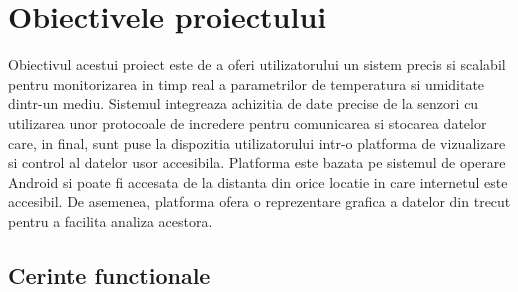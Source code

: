 \chapter{Obiectivele proiectului}\label{ch:obiective}
\pagestyle{fancy}
Obiectivul acestui proiect este de a oferi utilizatorului un sistem precis si scalabil pentru monitorizarea in timp real a parametrilor de temperatura si 
umiditate dintr-un mediu. Sistemul integreaza achizitia de date precise de la senzori cu utilizarea unor protocoale de incredere pentru comunicarea si 
stocarea datelor care, in final, sunt puse la dispozitia utilizatorului intr-o platforma de vizualizare si control al datelor usor accesibila. Platforma este 
bazata pe sistemul de operare Android si poate fi accesata de la distanta din orice locatie in care internetul este accesibil. De asemenea, platforma ofera 
o reprezentare grafica a datelor din trecut pentru a facilita analiza acestora.

\section{Cerinte functionale}\label{sec:cerinte_functionale}
